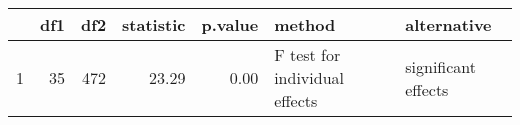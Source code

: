 \begin{table}[ht]
\centering
\begin{tabular}{rrrrrll}
  \hline
 & df1 & df2 & statistic & p.value & method & alternative \\ 
  \hline
1 &  35 & 472 & 23.29 & 0.00 & F test for individual effects & significant effects \\ 
   \hline
\end{tabular}
\end{table}
